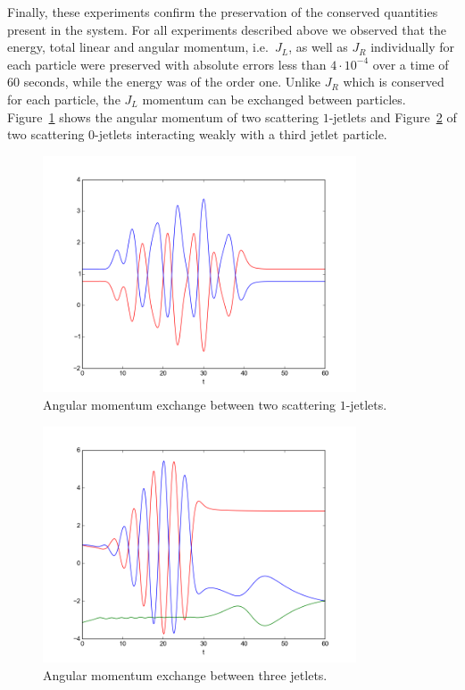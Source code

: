 \documentclass[12pt]{amsart}
\begin{document}
Finally, these experiments confirm the preservation of the conserved
quantities present in the system. For all experiments described above
we observed that the energy, total linear and angular momentum,
i.e.~$J_L$, as well as $J_R$ individually for each particle were
preserved with absolute errors less than $4 \cdot 10^{-4}$ over a time
of $60$ seconds, while the energy was of the order one. Unlike $J_R$
which is conserved for each particle, the $J_L$ momentum can be
exchanged between particles. Figure~\ref{fig:angmom-1jetlets} shows
the angular momentum of two scattering $1$-jetlets and
Figure~\ref{fig:angmom-3rd-jetlet} of two scattering $0$-jetlets
interacting weakly with a third jetlet particle.

\begin{figure}[htb]
  \centering
  \includegraphics[height=7cm]{angmom-1jetlets}
  \caption{Angular momentum exchange between two scattering $1$-jetlets.}
  \label{fig:angmom-1jetlets}
\end{figure}

\begin{figure}[htb]
  \centering
  \includegraphics[height=7cm]{angmom-3rd-jetlet}
  \caption{Angular momentum exchange between three jetlets.}
  \label{fig:angmom-3rd-jetlet}
\end{figure}
\end{document}
